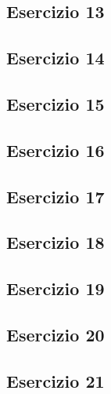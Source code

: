 \subsection{Esercizio 13}

\subsection{Esercizio 14}

\subsection{Esercizio 15}

\subsection{Esercizio 16}

\subsection{Esercizio 17}

\subsection{Esercizio 18}

\subsection{Esercizio 19}

\subsection{Esercizio 20}

\subsection{Esercizio 21}
